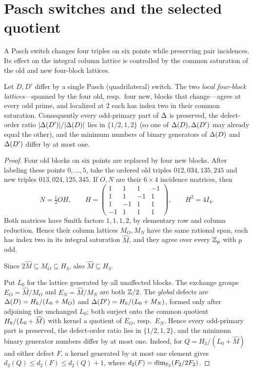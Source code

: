 \section{Pasch switches and the selected quotient}

A Pasch switch changes four triples on six points while preserving pair
incidences. Its effect on the integral column lattice is controlled by the
common saturation of the old and new four-block lattices.

\begin{theorem}\label{thm:pt}
Let $D,D'$ differ by a single Pasch (quadrilateral) switch. The two \emph{local
four-block lattices}---spanned by the four old, resp.\ four new, blocks that
change---agree at every odd prime, and localized at $2$ each has index two in
their common saturation. Consequently every odd-primary part of $\Delta$ is
preserved, the defect-order ratio $|\Delta(D')|/|\Delta(D)|$ lies in $\{1/2,1,2\}$
\textup(so one of $\Delta(D),\Delta(D')$ may already equal the other\textup), and
the minimum numbers of binary generators of $\Delta(D)$ and $\Delta(D')$ differ by
at most one.
\end{theorem}

\begin{proof}
Four old blocks on six points are replaced by four new blocks. After labeling
these points $0,\ldots,5$, take the ordered old triples
$012,034,135,245$ and new triples $013,024,125,345$. If $O,N$ are their
$6\times4$ incidence matrices, then
\[
N=\tfrac12 O H,\qquad
H=\begin{pmatrix}1&1&1&-1\\1&1&-1&1\\1&-1&1&1\\-1&1&1&1\end{pmatrix},
\qquad H^2=4I_4.
\]
Both matrices have Smith factors $1,1,1,2$, by elementary row and column
reduction. Hence their column lattices $M_O,M_N$ have the same rational span,
each has index two in its integral saturation $\widehat M$, and they agree
over every $\mathbb{Z}_p$ with $p$ odd.

Since $2\widehat M\subseteq M_O\subseteq H_3$,
also $\widehat M\subseteq H_3$.

Put $L_0$ for the lattice generated by all
unaffected blocks. The exchange groups $E_O=\widehat M/M_O$ and
$E_N=\widehat M/M_N$ are both $\mathbb{Z}/2$. The \emph{global} defects
are $\Delta(D)=H_k/(L_0+M_O)$ and $\Delta(D')=H_k/(L_0+M_N)$, formed only after
adjoining the unchanged $L_0$; both surject onto the common quotient
$H_k/(L_0+\widehat M)$ with kernel a quotient of $E_O$, resp.\ $E_N$. Hence every
odd-primary part is preserved, the defect-order ratio lies in $\{1/2,1,2\}$, and
the minimum binary generator numbers differ by at most one. Indeed, for
$Q=H_3/(L_0+\widehat M)$ and either defect $F$, a kernel generated by at most
one element gives $d_2(Q)\le d_2(F)\le d_2(Q)+1$, where
$d_2(F)=\dim_{\mathbb{F}_2}(F_2/2F_2)$.
\end{proof}

